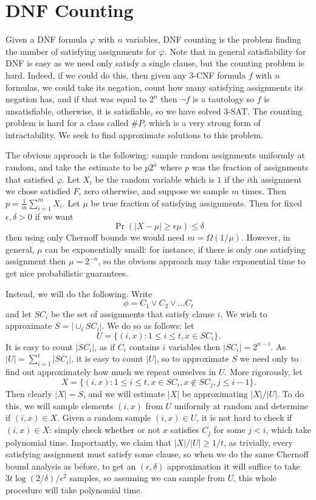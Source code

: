 \section{DNF Counting}
Given a DNF formula $\varphi$ with $n$ variables, DNF counting is the problem finding the number of satisfying assignments for $\varphi$. Note that in general satisfiability for DNF is easy as we need only satisfy a single clause, but the counting problem is hard. Indeed, if we could do this, then given any 3-CNF formula $f$ with $n$ formulas, we could take its negation, count how many satisfying assignments its negation has, and if that was equal to $2^n$ then $\neg f$ is a tautology so $f$ is unsatisfiable, otherwise, it is satisfiable, so we have solved 3-SAT. The counting problem is hard for a class called $\# P$, which is a very strong form of intractability. We seek to find approximate solutions to this problem.

The obvious approach is the following: sample random assignments uniformly at random, and take the estimate to be $p 2^n$ where $p$ was the fraction of assignments that satisfied $\varphi$. Let $X_i$ be the random variable which is $1$ if the $i$th assignment we chose satisfied $F$, zero otherwise, and suppose we sample $m$ times. Then $p = \frac{1}{m} \sum_{i = 1}^m X_i$. Let $\mu$ be true fraction of satisfying assignments. Then for fixed $\epsilon, \delta > 0$ if we want
\[\Pr (|X - \mu| \geq \epsilon \mu) \leq \delta\]
then using only Chernoff bounds we would need $m = \Omega (1 / \mu)$. However, in general, $\mu$ can be exponentially small: for instance, if there is only one satisfying assignment then $\mu = 2^{-n}$, so the obvious approach may take exponential time to get nice probabilistic guarantees.

Instead, we will do the following. Write
\[\phi = C_1 \vee C_2 \vee \ldots C_t\]
and let $SC_i$ be the set of assignments that satisfy clause $i$. We wish to approximate $S = |\cup_i SC_i|$. We do so as follows: let
\[U = \{(i, x): 1 \leq i \leq t, x \in SC_i\}.\]
It is easy to count $|SC_i|$, as if $C_i$ contains $i$ variables then $|SC_i| = 2^{n - i}$. As $|U| = \sum_{i = 1}^t |SC_i|$, it is easy to count $|U|$, so to approximate $S$ we need only to find out approximately how much we repeat ourselves in $U$. More rigorously, let
\[X = \{(i, x): 1 \leq i \leq t, x \in SC_i, x \not\in SC_j, j \leq i - 1\}.\]
Then clearly $|X| = S$, and we will estimate $|X|$ be approximating $|X| / |U|$. To do this, we will sample elements $(i, x)$ from $U$ uniformly at random and determine if $(i, x) \in X$. Given a random sample $(i, x) \in U$, it is not hard to check if $(i, x) \in X$: simply check whether or not $x$ satisfies $C_j$ for some $j < i$, which take polynomial time. Importantly, we claim that $|X| / |U| \geq 1 / t$, as trivially, every satisfying assignment must satisfy some clause, so when we do the same Chernoff bound analysis as before, to get an $(\epsilon, \delta)$ approximation it will suffice to take $3 t \log (2 / \delta) / \epsilon^2$ samples, so assuming we can sample from $U$, this whole procedure will take polynomial time.

